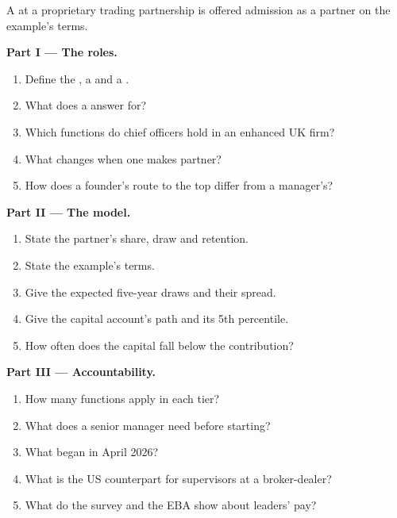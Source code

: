 \begin{problem}\label{pb:in:leadership-roles:1}
A  at a proprietary trading partnership is offered admission as a partner on the example's terms.

\medskip\noindent\textbf{Part I --- The roles.}
\begin{enumerate}
\item Define the , a  and a .
\item What does a  answer for?
\item Which functions do chief officers hold in an enhanced UK firm?
\item What changes when one makes partner?
\item How does a founder's route to the top differ from a manager's?
\end{enumerate}

\medskip\noindent\textbf{Part II --- The model.}
\begin{enumerate}[resume]
\item State the partner's share, draw and retention.
\item State the example's terms.
\item Give the expected five-year draws and their spread.
\item Give the capital account's path and its 5th percentile.
\item How often does the capital fall below the contribution?
\end{enumerate}

\medskip\noindent\textbf{Part III --- Accountability.}
\begin{enumerate}[resume]
\item How many functions apply in each tier?
\item What does a senior manager need before starting?
\item What began in April 2026?
\item What is the US counterpart for supervisors at a broker-dealer?
\item What do the survey and the EBA show about leaders' pay?
\end{enumerate}


\end{problem}
